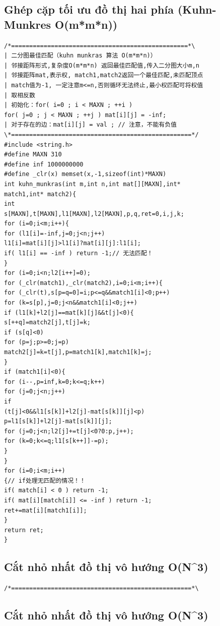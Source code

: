 \documentclass[11pt]{article}
\begin{document}
\subsection{Ghép cặp tối ưu đồ thị hai phía (Kuhn-Munkres O(m*m*n))}

\begingroup
\scriptsize
\begin{verbatim}
/*=================================================*\
| 二分图最佳匹配（kuhn munkras 算法 O(m*m*n)）
| 邻接距阵形式,复杂度O(m*m*n) 返回最佳匹配值,传入二分图大小m,n
| 邻接距阵mat,表示权, match1,match2返回一个最佳匹配,未匹配顶点
| match值为-1, 一定注意m<=n,否则循环无法终止,最小权匹配可将权值
| 取相反数
| 初始化：for( i=0 ; i < MAXN ; ++i )
for( j=0 ; j < MAXN ; ++j ) mat[i][j] = -inf;
| 对于存在的边：mat[i][j] = val ; // 注意，不能有负值
\*==================================================*/
#include <string.h>
#define MAXN 310
#define inf 1000000000
#define _clr(x) memset(x,-1,sizeof(int)*MAXN)
int kuhn_munkras(int m,int n,int mat[][MAXN],int*
match1,int* match2){
int
s[MAXN],t[MAXN],l1[MAXN],l2[MAXN],p,q,ret=0,i,j,k;
for (i=0;i<m;i++){
for (l1[i]=-inf,j=0;j<n;j++)
l1[i]=mat[i][j]>l1[i]?mat[i][j]:l1[i];
if( l1[i] == -inf ) return -1;// 无法匹配！
}
for (i=0;i<n;l2[i++]=0);
for (_clr(match1),_clr(match2),i=0;i<m;i++){
for (_clr(t),s[p=q=0]=i;p<=q&&match1[i]<0;p++)
for (k=s[p],j=0;j<n&&match1[i]<0;j++)
if (l1[k]+l2[j]==mat[k][j]&&t[j]<0){
s[++q]=match2[j],t[j]=k;
if (s[q]<0)
for (p=j;p>=0;j=p)
match2[j]=k=t[j],p=match1[k],match1[k]=j;
}
if (match1[i]<0){
for (i--,p=inf,k=0;k<=q;k++)
for (j=0;j<n;j++)
if
(t[j]<0&&l1[s[k]]+l2[j]-mat[s[k]][j]<p)
p=l1[s[k]]+l2[j]-mat[s[k]][j];
for (j=0;j<n;l2[j]+=t[j]<0?0:p,j++);
for (k=0;k<=q;l1[s[k++]]-=p);
}
}
for (i=0;i<m;i++)
{// if处理无匹配的情况！！
if( match[i] < 0 ) return -1;
if( mat[i][match[i]] <= -inf ) return -1;
ret+=mat[i][match1[i]];
}
return ret;
}
\end{verbatim}
\endgroup

\subsection{Cắt nhỏ nhất đồ thị vô hướng O(N\textasciicircum{}3)}

\begingroup
\scriptsize
\begin{verbatim}
/*==================================================*\
\end{verbatim}
\endgroup

\subsection{Cắt nhỏ nhất đồ thị vô hướng O(N\textasciicircum{}3)}
\end{document}
